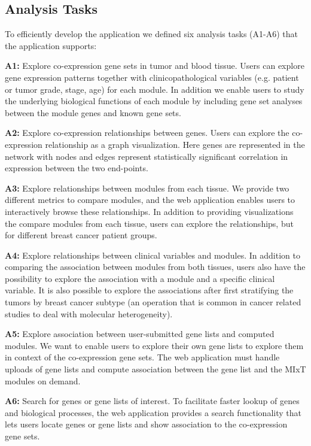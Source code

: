 \subsection{Analysis Tasks} 
To efficiently develop
the application we defined six analysis tasks (A1-A6) that the application
supports: 

\textbf{A1:} Explore co-expression gene sets in tumor and blood tissue.  Users
can explore gene expression patterns together with clinicopathological variables
(e.g. patient or tumor grade, stage, age) for each module.  In addition we
enable users to study the underlying biological functions of each module by
including gene set analyses between the module genes and known gene sets. 

\textbf{A2:} Explore co-expression relationships between genes. Users can
explore the co-expression relationship as a graph visualization. 
Here genes are represented in the network with nodes and edges represent 
statistically significant correlation in expression between the two end-points. 

\textbf{A3:} Explore relationships between modules from each tissue. We provide
two different metrics to compare modules, and the web application enables users
to interactively browse these relationships.  In addition to providing
visualizations the compare modules from each tissue, users can explore the
relationships, but for different breast cancer patient groups. 

\textbf{A4:} Explore relationships between clinical variables and modules. In
addition to comparing the association between modules from both tissues, users
also have the possibility to explore the association with a module and a
specific clinical variable. It is also possible to explore the associations
after first stratifying the tumors by breast cancer subtype (an operation that
is common in cancer related studies to deal with molecular heterogeneity).

\textbf{A5:} Explore association between user-submitted gene lists and computed
modules. We want to enable users to explore their own gene lists to explore
them in context of the co-expression gene sets. The web application must handle
uploads of gene lists and compute association between the gene list and the MIxT
modules on demand. 

\textbf{A6:} Search for genes or gene lists of interest. To facilitate faster
lookup of genes and biological processes, the web application provides a search
functionality that lets users locate genes or gene lists and show association to
the co-expression gene sets. 

